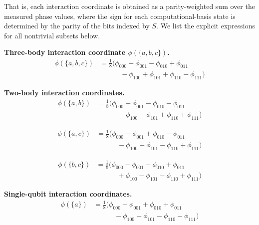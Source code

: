\medskip
\noindent
That is, each interaction coordinate is obtained as a parity-weighted sum over the measured phase values, where the sign for each computational-basis state is determined by the parity of the bits indexed by $S$. We list the explicit expressions for all nontrivial subsets below.

\medskip
\noindent\textbf{Three-body interaction coordinate $\phi(\{a,b,c\})$.}
\begin{equation}
\boxed{
\begin{aligned}
\phi(\{a,b,c\})
&= \frac{1}{8}\Big(
\phi_{000}
-\phi_{001}
-\phi_{010}
+\phi_{011} \\
&\qquad\quad
-\phi_{100}
+\phi_{101}
+\phi_{110}
-\phi_{111}
\Big)
\end{aligned}
}
\end{equation}

\medskip
\noindent\textbf{Two-body interaction coordinates.}
\begin{equation}
\boxed{
\begin{aligned}
\phi(\{a,b\})
&= \frac{1}{8}\Big(
\phi_{000}
+\phi_{001}
-\phi_{010}
-\phi_{011} \\
&\qquad\quad
-\phi_{100}
-\phi_{101}
+\phi_{110}
+\phi_{111}
\Big)
\end{aligned}
}
\end{equation}

\begin{equation}
\boxed{
\begin{aligned}
\phi(\{a,c\})
&= \frac{1}{8}\Big(
\phi_{000}
-\phi_{001}
+\phi_{010}
-\phi_{011} \\
&\qquad\quad
-\phi_{100}
+\phi_{101}
-\phi_{110}
+\phi_{111}
\Big)
\end{aligned}
}
\end{equation}

\begin{equation}
\boxed{
\begin{aligned}
\phi(\{b,c\})
&= \frac{1}{8}\Big(
\phi_{000}
-\phi_{001}
-\phi_{010}
+\phi_{011} \\
&\qquad\quad
+\phi_{100}
-\phi_{101}
-\phi_{110}
+\phi_{111}
\Big)
\end{aligned}
}
\end{equation}

\medskip
\noindent\textbf{Single-qubit interaction coordinates.}
\begin{equation}
\boxed{
\begin{aligned}
\phi(\{a\})
&= \frac{1}{8}\Big(
\phi_{000}
+\phi_{001}
+\phi_{010}
+\phi_{011} \\
&\qquad\quad
-\phi_{100}
-\phi_{101}
-\phi_{110}
-\phi_{111}
\Big)
\end{aligned}
}
\end{equation}


